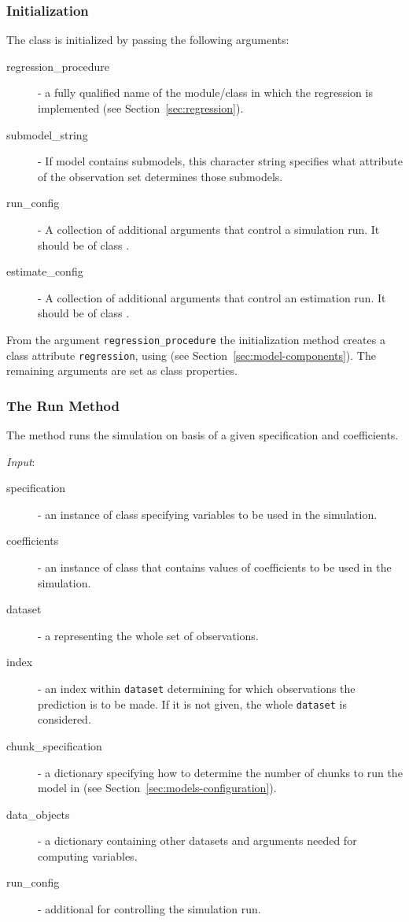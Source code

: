 {\subsubsection{Initialization}
The class is initialized by passing the following arguments:
\begin{description}
\item[regression_procedure] - a fully qualified name of the module/class in
  which the regression is implemented (see Section~\ref{sec:regression}).
\item[submodel_string] - If model contains submodels, this character string
  specifies what attribute of the observation set determines those submodels.
\item[run_config] - A collection of additional arguments that control a
  simulation run. It should be of class .
\item[estimate_config] - A collection of additional arguments that control an
  estimation run. It should be of class .
\end{description}
From the argument \verb|regression_procedure| the initialization method
creates a class attribute \attributesindex \verb|regression|, using
 (see Section~\ref{sec:model-components}).
The remaining arguments are set as class properties.

\subsubsection{The Run Method}
%
The  method runs the simulation on basis of a given
specification and coefficients. \coefficientsindex

{\it Input}:
\begin{description}
\item[specification] - an instance of class 
  specifying variables \variablesindex to be used in the simulation.
\item[coefficients] \coefficientsindex - an instance of class  \coefficientsindex that contains
  values of coefficients \coefficientsindex to be used in the simulation.
\item[dataset] \datasetindex - a  \datasetindex representing the whole set of observations.
\item[index] - an index within \verb|dataset| determining for which
  observations the prediction is to be made. If it is not given, the whole
  \verb|dataset| \datasetindex is considered.
\item[chunk_specification] - a dictionary specifying how to determine the number
  of chunks to run the model in (see Section~\ref{sec:models-configuration}).
\item[data_objects] - a dictionary containing other datasets \datasetindex and arguments
  needed for computing variables. \variablesindex
\item[run_config] - additional  for controlling the simulation
  run.
\end{description}

}
